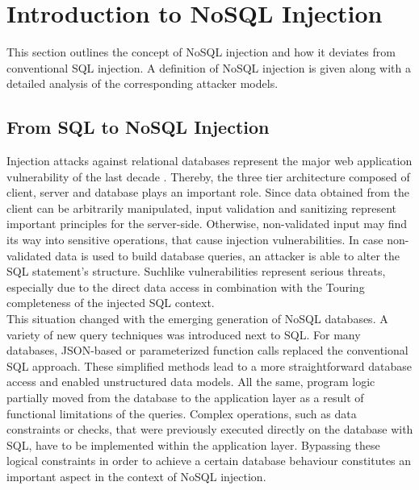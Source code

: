 \chapter{Introduction to NoSQL Injection}
\label{cha:intro_to_nosql_injection}
This section outlines the concept of NoSQL injection and how it deviates from conventional SQL injection. A definition of NoSQL injection is given along with a detailed analysis of the corresponding attacker models.

\section{From SQL to NoSQL Injection}
\label{sec:fromSQLtoNoSQLinjection}
Injection attacks against relational databases represent the major web application vulnerability of the last decade \cite{OWASP:2013b}. Thereby, the three tier architecture composed of client, server and database plays an important role. Since data obtained from the client can be arbitrarily manipulated, input validation and sanitizing represent important principles for the server-side. Otherwise, non-validated input may find its way into sensitive operations, that cause injection vulnerabilities. In case non-validated data is used to build database queries, an attacker is able to alter the SQL statement's structure. Suchlike vulnerabilities represent serious threats, especially due to the direct data access in combination with the Touring completeness of the injected SQL context.\\ 

This situation changed with the emerging generation of NoSQL databases. A variety of new query techniques was introduced next to SQL. For many databases, JSON-based or parameterized function calls replaced the conventional SQL approach. These simplified methods lead to a more straightforward database access and enabled unstructured data models. All the same, program logic partially moved from the database to the application layer as a result of functional limitations of the queries. Complex operations, such as data constraints or checks, that were previously executed directly on the database with SQL, have to be implemented within the application layer. Bypassing these logical constraints in order to achieve a certain database behaviour constitutes an important aspect in the context of NoSQL injection. \\ 

